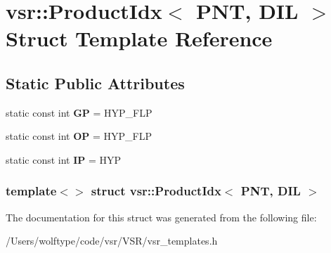 \hypertarget{structvsr_1_1_product_idx_3_01_p_n_t_00_01_d_i_l_01_4}{\section{vsr\-:\-:Product\-Idx$<$ P\-N\-T, D\-I\-L $>$ Struct Template Reference}
\label{structvsr_1_1_product_idx_3_01_p_n_t_00_01_d_i_l_01_4}
}
\subsection*{Static Public Attributes}
\begin{DoxyCompactItemize}
\item 
\hypertarget{structvsr_1_1_product_idx_3_01_p_n_t_00_01_d_i_l_01_4_afb19ae5fa3a1f8383634bc65529456ed}{static const int {\bfseries G\-P} = H\-Y\-P\-\_\-\-F\-L\-P}\label{structvsr_1_1_product_idx_3_01_p_n_t_00_01_d_i_l_01_4_afb19ae5fa3a1f8383634bc65529456ed}

\item 
\hypertarget{structvsr_1_1_product_idx_3_01_p_n_t_00_01_d_i_l_01_4_ad78653840b99ae25da0da89226c90dfb}{static const int {\bfseries O\-P} = H\-Y\-P\-\_\-\-F\-L\-P}\label{structvsr_1_1_product_idx_3_01_p_n_t_00_01_d_i_l_01_4_ad78653840b99ae25da0da89226c90dfb}

\item 
\hypertarget{structvsr_1_1_product_idx_3_01_p_n_t_00_01_d_i_l_01_4_af113a82cb5b794457b68837f174b5988}{static const int {\bfseries I\-P} = H\-Y\-P}\label{structvsr_1_1_product_idx_3_01_p_n_t_00_01_d_i_l_01_4_af113a82cb5b794457b68837f174b5988}

\end{DoxyCompactItemize}
\subsubsection*{template$<$$>$ struct vsr\-::\-Product\-Idx$<$ P\-N\-T, D\-I\-L $>$}



The documentation for this struct was generated from the following file\-:\begin{DoxyCompactItemize}
\item 
/\-Users/wolftype/code/vsr/\-V\-S\-R/vsr\-\_\-templates.\-h\end{DoxyCompactItemize}
